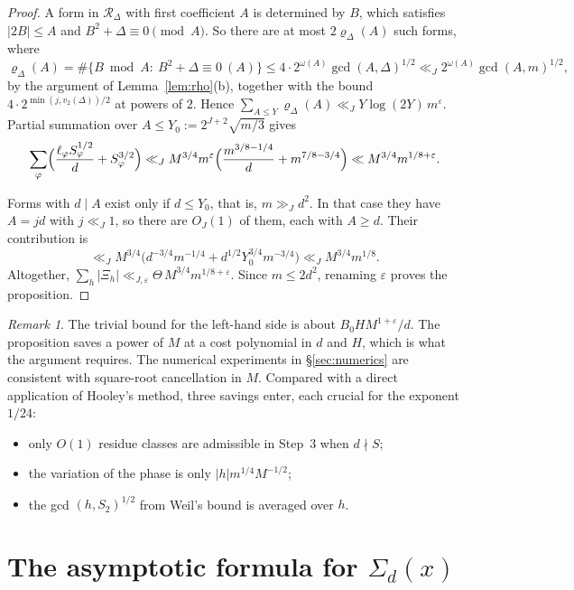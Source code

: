 \documentclass[11pt]{amsart}
\theoremstyle{remark}
\newtheorem{remark}[theorem]{Remark}
\theoremstyle{definition}
\numberwithin{equation}{section}
\newcommand{\eps}{\varepsilon}
\begin{document}
\begin{proof}
A form in $\mathcal R_\Delta$ with first coefficient $A$ is determined by $B$, which satisfies $|2B|\le A$ and $B^2+\Delta\equiv0\pmod A$. So there are at most $2\varrho_\Delta(A)$ such forms, where
\[
\varrho_\Delta(A)=\#\{B\bmod A:\ B^2+\Delta\equiv0\ (A)\}\le4\cdot2^{\omega(A)}\gcd(A,\Delta)^{1/2}\ll_J2^{\omega(A)}\gcd(A,m)^{1/2},
\]
by the argument of Lemma~\ref{lem:rho}(b), together with the bound $4\cdot2^{\min(j,v_2(\Delta))/2}$ at powers of $2$. Hence $\sum_{A\le Y}\varrho_\Delta(A)\ll_J Y\log(2Y)\,m^{\eps}$. Partial summation over $A\le Y_0:=2^{J+2}\sqrt{m/3}$ gives
\[
\sum_{\varphi}\Bigl(\frac{\ell_\varphi S_\varphi^{1/2}}d+S_\varphi^{3/2}\Bigr)\ll_JM^{3/4}m^{\eps}\Bigl(\frac{m^{3/8-1/4}}{d}+m^{7/8-3/4}\Bigr)\ll M^{3/4}m^{1/8+\eps}.
\]

Forms with $d\mid A$ exist only if $d\le Y_0$, that is, $m\gg_Jd^2$. In that case they have $A=jd$ with $j\ll_J1$, so there are $O_J(1)$ of them, each with $A\ge d$. Their contribution is
\[
\ll_J M^{3/4}\bigl(d^{-3/4}m^{-1/4}+d^{1/2}Y_0^{3/4}m^{-3/4}\bigr)\ll_J M^{3/4}m^{1/8}.
\]
Altogether, $\sum_h|\Xi_h|\ll_{J,\eps}\Theta\,M^{3/4}m^{1/8+\eps}$. Since $m\le2d^2$, renaming $\eps$ proves the proposition.
\end{proof}

\begin{remark}
The trivial bound for the left-hand side is about $B_0HM^{1+\eps}/d$. The proposition saves a power of $M$ at a cost polynomial in $d$ and $H$, which is what the argument requires. The numerical experiments in \S\ref{sec:numerics} are consistent with square-root cancellation in $M$. Compared with a direct application of Hooley's method, three savings enter, each crucial for the exponent $1/24$:
\begin{itemize}
\item only $O(1)$ residue classes are admissible in Step~3 when $d\nmid S$;
\item the variation of the phase is only $|h|m^{1/4}M^{-1/2}$;
\item the gcd $(h,S_2)^{1/2}$ from Weil's bound is averaged over $h$.
\end{itemize}
\end{remark}

\section{\texorpdfstring{The asymptotic formula for $\Sigma_d(x)$}{The asymptotic formula for Sigma\_d(x)}}\label{sec:asymp}
\end{document}
